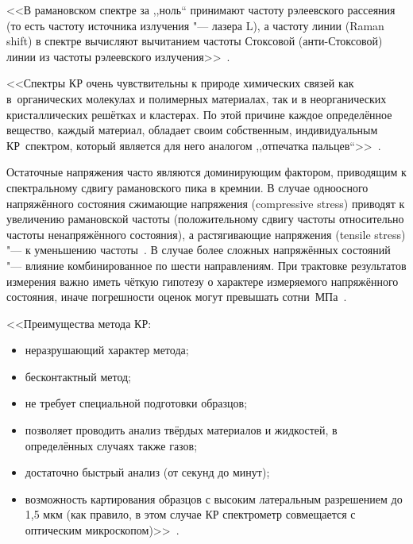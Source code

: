 <<В рамановском спектре за ,,ноль`` принимают частоту рэлеевского рассеяния (то есть частоту источника излучения "--- лазера L), а частоту линии (Raman shift) в спектре вычисляют вычитанием частоты Стоксовой (анти-Стоксовой) линии из частоты рэлеевского излучения>>~\cite{belogorohov2014_dis}.

<<Спектры КР очень чувствительны к природе химических связей как в~органических молекулах и полимерных материалах, так и в неорганических кристаллических решётках и кластерах. По этой причине каждое определённое вещество, каждый материал, обладает своим собственным, индивидуальным КР~спектром, который является для него аналогом ,,отпечатка пальцев``>>~\cite{belogorohov2014_dis}.

Остаточные напряжения часто являются доминирующим фактором, приводящим к
спектральному сдвигу рамановского пика в кремнии.
В случае одноосного напряжённого состояния сжимающие напряжения (compressive
stress) приводят к увеличению рамановской частоты (положительному сдвигу частоты
относительно частоты ненапряжённого состояния), а растягивающие напряжения
(tensile stress) "--- к уменьшению частоты~\cite{DeWolf1996}. В случае более
сложных напряжённых состояний "--- влияние комбинированное по шести
направлениям. При трактовке результатов измерения важно иметь чёткую
гипотезу о характере измеряемого напряжённого состояния, иначе погрешности
оценок могут превышать
сотни~МПа~\cite{Srikar2003critreview}.

<<Преимущества метода КР:
\begin{itemize}
    \item неразрушающий характер метода;
    \item бесконтактный метод;
    \item не требует специальной подготовки образцов;
    \item позволяет проводить анализ твёрдых материалов и жидкостей, в определённых случаях также газов;
    \item достаточно быстрый анализ (от секунд до минут);
    \item возможность картирования образцов с высоким латеральным разрешением до 1,5 мкм (как правило, в этом случае КР спектрометр совмещается с оптическим микроскопом)>>~\cite{mironov2011_issledovanie_metodom_raman}.
\end{itemize}

